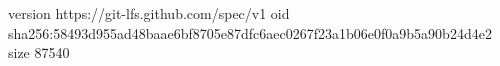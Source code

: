 version https://git-lfs.github.com/spec/v1
oid sha256:58493d955ad48baae6bf8705e87dfc6aec0267f23a1b06e0f0a9b5a90b24d4e2
size 87540
